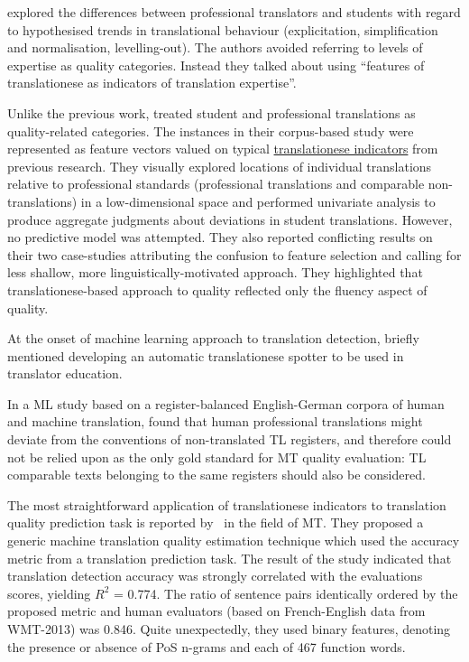 \citet{Redelinghuys2015,Redelinghuys2016} explored the differences between professional translators and students with regard to hypothesised trends in translational behaviour (explicitation, simplification and normalisation, levelling-out). The authors avoided referring to levels of expertise as quality categories. Instead they talked about using ``features of translationese as indicators of translation expertise''\cite[p.192]{Redelinghuys2016}. 

Unlike the previous work, \citet{Sutter2017} treated student and professional translations as quality-related categories. The instances in their corpus-based study were represented as feature vectors valued on typical \hyperlink{wd:sutters}{translationese indicators} from previous research. They visually explored locations of individual translations relative to professional standards (professional translations and comparable non-translations) in a low-dimensional space and performed univariate analysis to produce aggregate judgments about deviations in student translations. However, no predictive model was attempted. They also reported conflicting results on their two case-studies attributing the confusion to feature selection and calling for less shallow, more linguistically-motivated approach. They highlighted that translationese-based approach to quality reflected only the fluency aspect of quality.

At the onset of machine learning approach to translation detection, \citet{Baroni2006} briefly mentioned developing an automatic translationese spotter to be used in translator education. 

In a ML study based on a register-balanced English-German corpora of human and machine translation, \citet{Lapshinova2015} found that human professional translations might deviate from the conventions of non-translated TL registers, and therefore could not be relied upon as the only gold standard for MT quality evaluation: TL comparable texts belonging to the same registers should also be considered. 

The most straightforward application of translationese indicators to translation quality prediction task is reported by~\citet{Aharoni2014} in the field of MT. They proposed a generic machine translation quality estimation technique which used the accuracy metric from a translation prediction task. The result of the study indicated that translation detection accuracy was strongly correlated with the evaluations scores, yielding $R^2$ = 0.774. The ratio of sentence pairs identically ordered by the proposed metric and human evaluators (based on French-English data from \gls{WMT}-2013) was 0.846. Quite unexpectedly, they used binary features, denoting the presence or absence of PoS n-grams and each of 467 function words.

